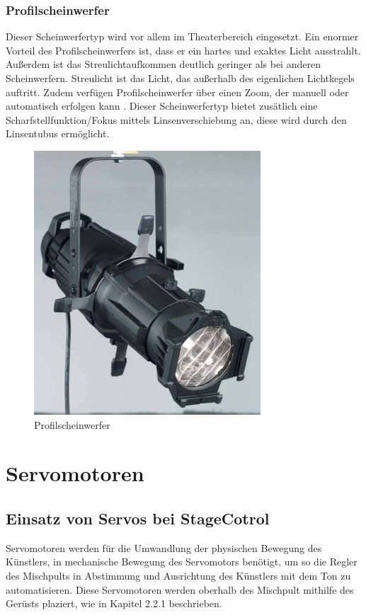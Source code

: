 \subsubsection{Profilscheinwerfer}
Dieser Scheinwerfertyp wird vor allem im Theaterbereich eingesetzt. Ein enormer Vorteil des Profilscheinwerfers ist, dass er ein hartes und exaktes Licht ausstrahlt. Außerdem ist das Streulichtaufkommen deutlich geringer als bei anderen Scheinwerfern. Streulicht ist das Licht, das außerhalb des eigenlichen Lichtkegels auftritt. Zudem verfügen Profilscheinwerfer über einen Zoom, der manuell oder automatisch erfolgen kann \parencite{Profilscheinwerfer}. Dieser Scheinwerfertyp bietet zusätlich eine Scharfstellfunktion/Fokus mittels Linsenverschiebung an, diese wird durch den Linsentubus ermöglicht.\\


\begin{figure}[H]
	\centering
	\includegraphics[width=0.4\linewidth]{images/Profilscheinwerfer.jpg}
	\caption[Profilscheinwerfer]{Profilscheinwerfer}
	\label{fig:Profilscheinwerfer}
\end{figure}

\section{Servomotoren}
\subsection{Einsatz von Servos bei StageCotrol}
Servomotoren werden für die Umwandlung der physischen Bewegung des Künstlers, in mechanische Bewegung des Servomotors benötigt, um so die Regler des Mischpults in Abstimmung und Ausrichtung des Künstlers mit dem Ton zu automatisieren. Diese Servomotoren werden oberhalb des Mischpult mithilfe des Gerüsts plaziert, wie in Kapitel 2.2.1 beschrieben.

